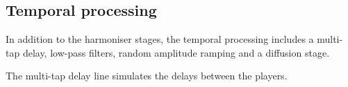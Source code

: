 \subsection{Temporal processing}
In addition to the harmoniser stages, the temporal processing includes a multi-tap delay, low-pass filters, random amplitude ramping and a diffusion stage.

The multi-tap delay line simulates the delays between the players. 

